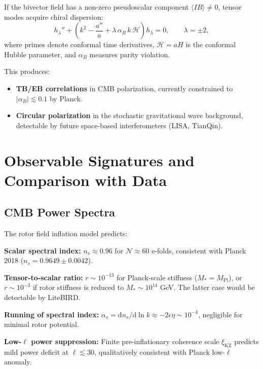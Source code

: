 \documentclass[11pt,a4paper]{article}
\numberwithin{equation}{section}
\theoremstyle{plain}
\theoremstyle{definition}
\theoremstyle{remark}
\newcommand{\dd}{\mathrm{d}}
\begin{document}
If the bivector field has a non-zero pseudoscalar component $\langle I B \rangle \neq 0$, tensor modes acquire chiral dispersion:
\begin{equation}
h_\lambda'' + \left(k^2 - \frac{a''}{a} + \lambda\,\alpha_B\,k\,\mathcal{H}\right)h_\lambda = 0,\qquad \lambda = \pm 2,
\label{eq:chiral-tensor}
\end{equation}
where primes denote conformal time derivatives, $\mathcal{H} = aH$ is the conformal Hubble parameter, and $\alpha_B$ measures parity violation.

This produces:
\begin{itemize}
  \item \textbf{TB/EB correlations} in CMB polarization, currently constrained to $|\alpha_B| \lesssim 0.1$ by Planck.
  \item \textbf{Circular polarization} in the stochastic gravitational wave background, detectable by future space-based interferometers (LISA, TianQin).
\end{itemize}

\section{Observable Signatures and Comparison with Data}
\label{sec:obs}

\subsection{CMB Power Spectra}

The rotor field inflation model predicts:

\textbf{Scalar spectral index:} $n_s \approx 0.96$ for $\mathcal{N} \approx 60$ e-folds, consistent with Planck 2018 ($n_s = 0.9649 \pm 0.0042$).

\textbf{Tensor-to-scalar ratio:} $r \sim 10^{-13}$ for Planck-scale stiffness ($M_* = M_{\mathrm{Pl}}$), or $r \sim 10^{-3}$ if rotor stiffness is reduced to $M_* \sim 10^{14}$ GeV. The latter case would be detectable by LiteBIRD.

\textbf{Running of spectral index:} $\alpha_s = \dd n_s/\dd \ln k \approx -2\epsilon\eta \sim 10^{-4}$, negligible for minimal rotor potential.

\textbf{Low-$\ell$ power suppression:} Finite pre-inflationary coherence scale $\xi_{\mathrm{KZ}}$ predicts mild power deficit at $\ell \lesssim 30$, qualitatively consistent with Planck low-$\ell$ anomaly.
\end{document}

